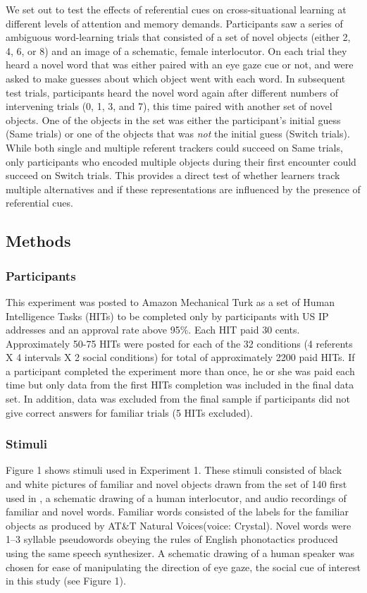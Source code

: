 \documentclass[10pt,letterpaper]{article}
\begin{document}
We set out to test the effects of referential cues on cross-situational learning at different levels of attention and memory demands. Participants saw a series of ambiguous word-learning trials that consisted of a set of novel objects (either 2, 4, 6, or 8) and an image of a schematic, female interlocutor. On each trial they heard a novel word that was either paired with an eye gaze cue or not, and were asked to make guesses about which object went with each word. In subsequent test trials, participants heard the novel word again after different numbers of intervening trials (0, 1, 3, and 7), this time paired with another set of novel objects. One of the objects in the set was either the participant's initial guess (Same trials) or one of the objects that was \emph{not} the initial guess (Switch trials). While both single and multiple referent trackers could succeed on Same trials, only participants who encoded multiple objects during their first encounter could succeed on Switch trials. This provides a direct test of whether learners track multiple alternatives and if these representations are influenced by the presence of referential cues. 

\subsection{Methods}

\subsubsection{Participants}

This experiment was posted to Amazon Mechanical Turk as a set of
Human Intelligence Tasks (HITs) to be completed only by participants with US IP
addresses and an approval rate above 95\%. Each HIT paid 30 cents. Approximately 50-75 HITs were posted for each of the 32 conditions (4 referents X 4 intervals X 2 social conditions) for total of approximately 2200 paid HITs. If a participant completed the experiment more than once, he or she was paid each time but only data from the first HITs completion was included in the final data set. In
addition, data was excluded from the final sample if participants did not give correct answers for familiar trials (5 HITs excluded).

\subsubsection{Stimuli}
Figure 1 shows stimuli used in Experiment 1. These stimuli consisted of black and white pictures of familiar and novel objects drawn from the set of 140 first used in , a schematic drawing of a human interlocutor, and audio recordings of familiar and novel words. 
Familiar words consisted of the labels for the familiar objects as produced by AT\&T Natural Voices\texttrademark (voice: Crystal). Novel words were 1--3 syllable pseudowords obeying the rules of English phonotactics produced using the same speech synthesizer. 
A schematic drawing of a human speaker was chosen for ease of manipulating the direction of eye gaze, the social cue of interest in this study (see Figure 1). 
\end{document}
